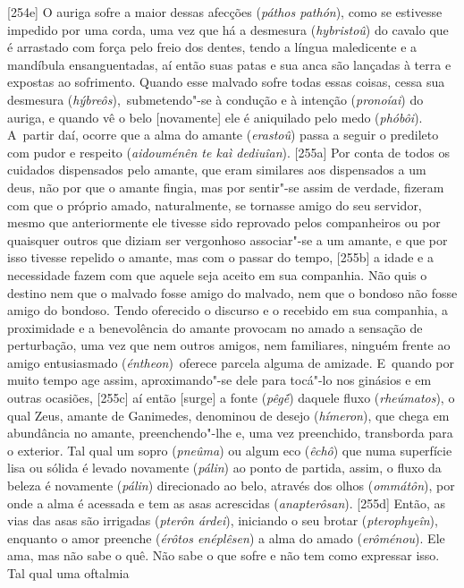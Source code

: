[254e] O auriga sofre a maior dessas afecções (\emph{páthos
pathón}), como se estivesse impedido por uma corda, uma vez que há a
desmesura (\emph{hybristoû}) do cavalo que é arrastado com força pelo
freio dos dentes, tendo a língua maledicente e a mandíbula
ensanguentadas, aí então suas patas e sua anca são lançadas à terra e
expostas ao sofrimento. Quando esse malvado sofre todas essas coisas,
cessa sua desmesura (\emph{hýbreôs}),~submetendo"-se à condução e à
intenção (\emph{pronoíai}) do auriga, e quando vê o belo [novamente]
ele é aniquilado pelo medo (\emph{phóbôi}). A~partir daí, ocorre que a
alma do amante (\emph{erastoû}) passa a seguir o predileto com pudor e
respeito (\emph{aidouménên te kaì dediuîan}). [255a] Por conta de
todos os cuidados dispensados pelo amante, que eram similares aos
dispensados a um deus, não por que o amante fingia, mas por sentir"-se
assim de verdade, fizeram com que o próprio amado, naturalmente, se
tornasse amigo do seu servidor, mesmo que anteriormente ele tivesse sido
reprovado pelos companheiros ou por quaisquer outros que diziam ser
vergonhoso associar"-se a um amante, e que por isso tivesse repelido o
amante, mas com o passar do tempo, [255b] a idade e a necessidade
fazem com que aquele seja aceito em sua companhia. Não quis o destino
nem que o malvado fosse amigo do malvado, nem que o bondoso não fosse
amigo do bondoso. Tendo oferecido o discurso e o recebido em sua
companhia, a proximidade e a benevolência do amante provocam no amado a
sensação de perturbação, uma vez que nem outros amigos, nem familiares,
ninguém frente ao amigo entusiasmado (\emph{éntheon})~oferece parcela
alguma de amizade. E~quando por muito tempo age assim, aproximando"-se
dele para tocá"-lo nos ginásios e em outras ocasiões, [255c] aí então
[surge] a fonte (\emph{pêgḗ}) daquele fluxo (\emph{rheúmatos}), o
qual Zeus, amante de Ganimedes, denominou de desejo (\emph{hímeron}),
que chega em abundância no amante, preenchendo"-lhe e, uma vez
preenchido, transborda para o exterior. Tal qual um sopro
(\emph{pneûma}) ou algum eco (\emph{êchô}) que numa superfície lisa ou
sólida é levado novamente (\emph{pálin}) ao ponto de partida, assim, o
fluxo da beleza é novamente (\emph{pálin}) direcionado ao belo, através
dos olhos (\emph{ommátôn}), por onde a alma é acessada e tem as asas
acrescidas (\emph{anapterôsan}). [255d] Então, as vias das asas são
irrigadas (\emph{pterôn árdei}), iniciando o seu brotar
(\emph{pterophyeîn}), enquanto o amor preenche (\emph{érôtos enéplêsen})
a alma do amado (\emph{erôménou}). Ele ama, mas não sabe o quê. Não sabe
o que sofre e não tem como expressar isso. Tal qual uma oftalmia
